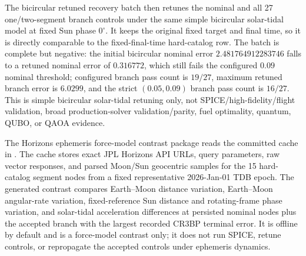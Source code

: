 \documentclass[11pt]{article}
\begin{document}
\begin{table}[htbp]
\centering
\caption{Bicircular solar-tidal stress replay from persisted tail-coast accepted-control sidecars. Controls are not retuned under the perturbation; failures are external-validity limitations of the persisted CR3BP controls.}
\label{tab:supp_bicircular_solar_tidal_stress}
\resizebox{0.9\textwidth}{!}{}
\end{table}

The bicircular retuned recovery batch then retunes the nominal and all 27 one/two-segment branch controls under the same simple bicircular solar-tidal model at fixed Sun phase $0^\circ$. It keeps the original fixed target and final time, so it is directly comparable to the fixed-final-time hard-catalog row. The batch is complete but negative: the initial bicircular nominal error $2.481764912283746$ falls to a retuned nominal error of $0.316772$, which still fails the configured $0.09$ nominal threshold; configured branch pass count is $19/27$, maximum retuned branch error is $6.0299$, and the strict $(0.05,0.09)$ branch pass count is $16/27$. This is simple bicircular solar-tidal retuning only, not SPICE/high-fidelity/flight validation, broad production-solver validation/parity, fuel optimality, quantum, QUBO, or QAOA evidence.

\begin{table}[htbp]
\centering
\caption{Bicircular tail-coast retuned recovery summary. The package retunes under a fixed-phase simple bicircular solar-tidal model but still fails the configured and strict threshold checks.}
\label{tab:supp_bicircular_tail_coast_recovery}
\resizebox{0.9\textwidth}{!}{}
\end{table}

The Horizons ephemeris force-model contrast package reads the committed cache in . The cache stores exact JPL Horizons API URLs, query parameters, raw vector responses, and parsed Moon/Sun geocentric samples for the 15 hard-catalog segment nodes from a fixed representative 2026-Jan-01 TDB epoch. The generated contrast compares Earth--Moon distance variation, Earth--Moon angular-rate variation, fixed-reference Sun distance and rotating-frame phase variation, and solar-tidal acceleration differences at persisted nominal nodes plus the accepted branch with the largest recorded CR3BP terminal error. It is offline by default and is a force-model contrast only; it does not run SPICE, retune controls, or repropagate the accepted controls under ephemeris dynamics.
\end{document}
